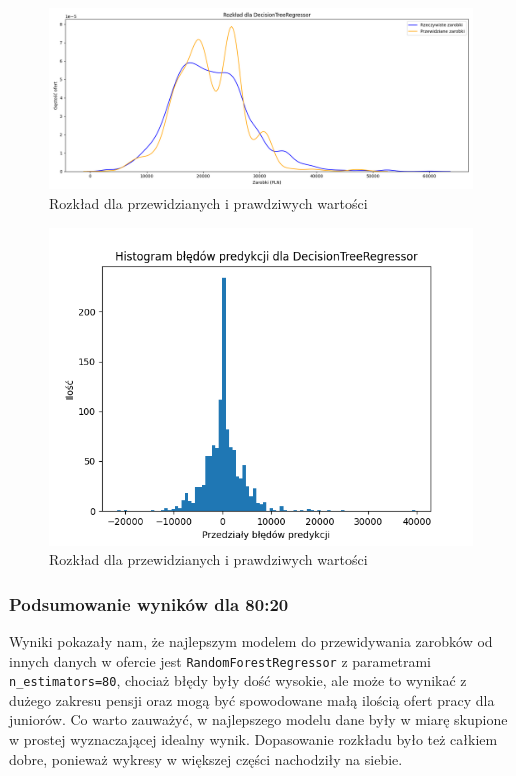 \documentclass[a4paper]{article}
\begin{document}
\begin{figure}[H]
    \centering
    \includegraphics[width=\textwidth]{../analysis/plots/wyniki/0.8&0.2/DecisionTreeRegressor/salary_dist.png}
    \caption{Rozkład dla przewidzianych i prawdziwych wartości}
\end{figure}

\begin{figure}[H]
    \centering
    \includegraphics[width=\textwidth]{../analysis/plots/wyniki/0.8&0.2/DecisionTreeRegressor/errors.png}
    \caption{Rozkład dla przewidzianych i prawdziwych wartości}
\end{figure}

\subsubsection{Podsumowanie wyników dla 80:20}

\quad Wyniki pokazały nam, że najlepszym modelem do przewidywania zarobków od innych danych w ofercie jest \texttt{RandomForestRegressor} z parametrami \texttt{n\_estimators=80},
chociaż błędy były dość wysokie, ale może to wynikać z dużego zakresu pensji oraz mogą być spowodowane małą ilością ofert pracy dla juniorów. Co warto zauważyć,
w najlepszego modelu dane były w miarę skupione w prostej wyznaczającej idealny wynik. Dopasowanie rozkładu było też całkiem dobre, ponieważ
wykresy w większej części nachodziły na siebie.
\end{document}
